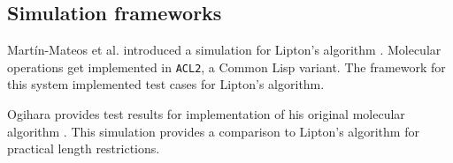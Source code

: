 	\subsection{Simulation frameworks}

Martín-Mateos et al. introduced a simulation for Lipton's algorithm \cite{MartinMateos02molecularcomputation}.   Molecular operations get implemented in \texttt{ACL2}, a Common Lisp variant.  The framework for this system implemented test cases for Lipton's algorithm.

Ogihara provides test results for implementation of his original molecular algorithm \cite{Ogihara:1996:BFS:898228}.  This simulation provides a comparison to Lipton's algorithm for practical length restrictions.
